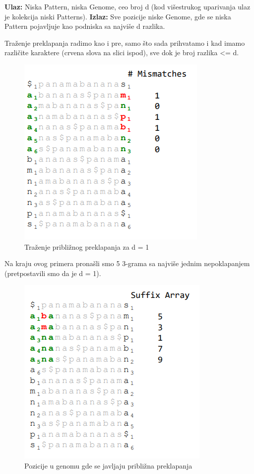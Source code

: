 \textbf{Ulaz:} Niska Pattern, niska Genome, ceo broj d (kod višestrukog uparivanja ulaz je kolekcija niski Patterns).
\textbf{Izlaz:} Sve pozicije niske Genome, gde se niska Pattern pojavljuje kao podniska sa najviše d razlika.

Traženje preklapanja radimo kao i pre, samo što sada prihvatamo i kad imamo različite karaktere (crvena slova na slici ispod), sve dok je broj razlika <= d.

\begin{figure}[h!]
\centering
\includegraphics[scale=0.5]{poglavlja/9/slike/PribliznoPreklapanjeMissmatch.png}
\caption{Traženje približnog preklapanja za d = 1}
\label{slika:X}
\end{figure}
\newpage
Na kraju ovog primera pronašli smo 5 3-grama sa najviše jednim nepoklapanjem (pretpostavili smo da je d = 1).

\begin{figure}[h!]
\centering
\includegraphics[scale=0.5]{poglavlja/9/slike/PribliznoPreklapanjeTrazenjeNiske.png}
\caption{Pozicije u genomu gde se javljaju približna preklapanja}
\label{slika:X}
\end{figure}


